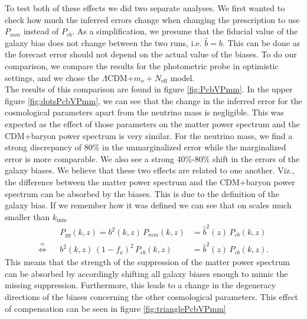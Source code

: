 \documentclass[oneside]{book}
\begin{document}
To test both of these effects we did two separate analyses. We first wanted to check how much the inferred errors change when changing the prescription to use $P_{mm}$ instead of $P_{cb}$. As a simplification, we presume that the fiducial value of the galaxy bias does not change between the two runs, i.e. $\hat{b}=b$. This can be done as the forecast error should not depend on the actual value of the biases. To do our comparison, we compare the results for the photometric probe in optimistic settings, and we chose the $\Lambda$CDM+$m_\nu+N_\mathrm{eff}$ model.\\  
The results of this comparison are found in figure \ref{fig:PcbVPmm}. In the upper figure \ref{fig:dotsPcbVPmm}, we can see that the change in the inferred error for the cosmological parameters apart from the neutrino mass is negligible. This was expected as the effect of those parameters on the matter power spectrum and the CDM+baryon power spectrum is very similar. For the neutrino mass, we find a strong discrepancy of 80\% in the unmarginalized error while the marginalized error is more comparable. We also see a strong 40\%-80\% shift in the errors of the galaxy biases. We believe that these two effects are related to one another. Viz., the difference between the matter power spectrum and the CDM+baryon power spectrum can be absorbed by the biases. This is due to the definition of the galaxy bias. If we remember how it was defined we can see that on scales much smaller than $k_\mathrm{min}$
\begin{align}
    &&P_{gg}(k,z) = b^2(k,z)\,P_{mm}(k,z) &= \hat{b}^2(z)\,P_{cb}(k,z)\nonumber\\
    \overset{\approx}{\Longleftrightarrow}&& b^2(k,z)\,(1-f_\nu)^2\,P_{cb}(k,z) &= \hat{b}^2(z)\,P_{cb}(k,z).\nonumber
\end{align}
This means that the strength of the suppression of the matter power spectrum can be absorbed by accordingly shifting all galaxy biases enough to mimic the missing suppression. Furthermore, this leads to a change in the degeneracy directions of the biases concerning the other cosmological parameters. This effect of compensation can be seen in figure \ref{fig:trianglePcbVPmm}\\
\end{document}
